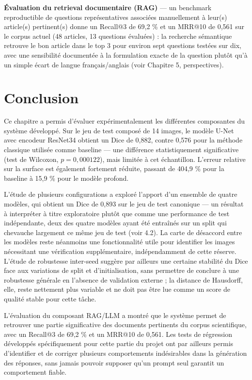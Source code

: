 \documentclass[12pt,a4paper]{report}
\begin{document}
\textbf{Évaluation du retrieval documentaire (RAG)} --- un benchmark reproductible de questions représentatives associées manuellement à leur(s) article(s) pertinent(s) donne un Recall@3 de 69,2 \% et un MRR@10 de 0,561 sur le corpus actuel (48 articles, 13 questions évaluées) : la recherche sémantique retrouve le bon article dans le top 3 pour environ sept questions testées sur dix, avec une sensibilité documentée à la formulation exacte de la question plutôt qu'à un simple écart de langue français/anglais (voir Chapitre 5, perspectives).

\section{Conclusion}

Ce chapitre a permis d'évaluer expérimentalement les différentes composantes du système développé. Sur le jeu de test composé de 14 images, le modèle U-Net avec encodeur ResNet34 obtient un Dice de 0,882, contre 0,576 pour la méthode classique utilisée comme baseline --- une différence statistiquement significative (test de Wilcoxon, $p = 0,000122$), mais limitée à cet échantillon. L'erreur relative sur la surface est également fortement réduite, passant de 404,9 \% pour la baseline à 15,9 \% pour le modèle profond.

L'étude de plusieurs configurations a exploré l'apport d'un ensemble de quatre modèles, qui obtient un Dice de 0,893 sur le jeu de test canonique --- un résultat à interpréter à titre exploratoire plutôt que comme une performance de test indépendante, deux des quatre modèles ayant été entraînés sur un split qui chevauche largement ce même jeu de test (voir 4.2). La carte de désaccord entre les modèles reste néanmoins une fonctionnalité utile pour identifier les images nécessitant une vérification supplémentaire, indépendamment de cette réserve. L'étude de robustesse inter-seed suggère par ailleurs une certaine stabilité du Dice face aux variations de split et d'initialisation, sans permettre de conclure à une robustesse générale en l'absence de validation externe ; la distance de Hausdorff, elle, reste nettement plus variable et ne doit pas être lue comme un score de qualité stable pour cette tâche.

L'évaluation du composant RAG/LLM a montré que le système permet de retrouver une partie significative des documents pertinents du corpus scientifique, avec un Recall@3 de 69,2 \% et un MRR@10 de 0,561. Les tests de régression développés spécifiquement pour cette partie du projet ont par ailleurs permis d'identifier et de corriger plusieurs comportements indésirables dans la génération des réponses, sans jamais pouvoir supposer qu'un prompt seul garantit un comportement fiable.
\end{document}
